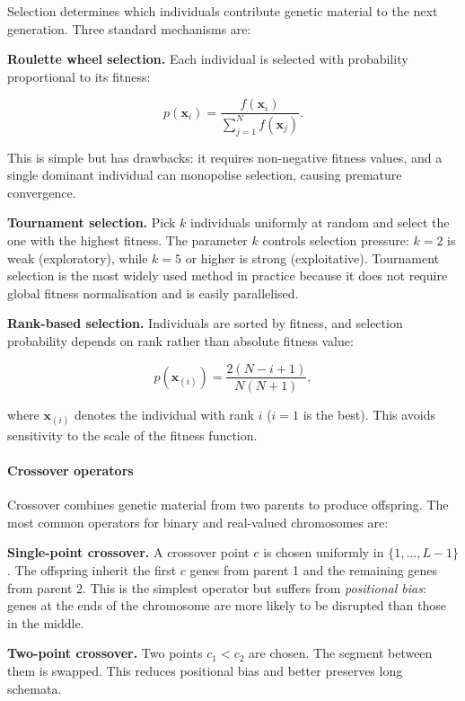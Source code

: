 Selection determines which individuals contribute genetic material to the next generation. Three standard mechanisms are:

\textbf{Roulette wheel selection.} Each individual is selected with probability proportional to its fitness:

\begin{equation}
p(\mathbf{x}_i) = \frac{f(\mathbf{x}_i)}{\sum_{j=1}^{N} f(\mathbf{x}_j)}. \tag{11.3}
\end{equation}

This is simple but has drawbacks: it requires non-negative fitness values, and a single dominant individual can monopolise selection, causing premature convergence.

\textbf{Tournament selection.} Pick $k$ individuals uniformly at random and select the one with the highest fitness. The parameter $k$ controls selection pressure: $k = 2$ is weak (exploratory), while $k = 5$ or higher is strong (exploitative). Tournament selection is the most widely used method in practice because it does not require global fitness normalisation and is easily parallelised.

\textbf{Rank-based selection.} Individuals are sorted by fitness, and selection probability depends on rank rather than absolute fitness value:

\begin{equation}
p(\mathbf{x}_{(i)}) = \frac{2(N - i + 1)}{N(N + 1)},
\end{equation}

where $\mathbf{x}_{(i)}$ denotes the individual with rank $i$ ($i=1$ is the best). This avoids sensitivity to the scale of the fitness function.

\paragraph{Crossover operators}

Crossover combines genetic material from two parents to produce offspring. The most common operators for binary and real-valued chromosomes are:

\textbf{Single-point crossover.} A crossover point $c$ is chosen uniformly in $\{1, \ldots, L -1\}$. The offspring inherit the first $c$ genes from parent 1 and the remaining genes from parent 2. This is the simplest operator but suffers from \textit{positional bias}: genes at the ends of the chromosome are more likely to be disrupted than those in the middle.

\textbf{Two-point crossover.} Two points $c_1 < c_2$ are chosen. The segment between them is swapped. This reduces positional bias and better preserves long schemata.

